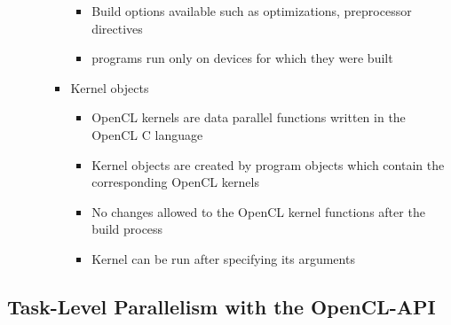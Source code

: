 \documentclass[paper=a4, fontsize=11pt]{scrartcl} %
\numberwithin{equation}{section} %
\numberwithin{figure}{section} %
\numberwithin{table}{section} %
\begin{document}
\begin{itemize}
\begin{itemize}
\begin{itemize}
\begin{itemize}
        \item Build options available such as optimizations, preprocessor directives
        \item programs run only on devices for which they were built
      \end{itemize}
      \item Kernel objects
      \begin{itemize}
        \item OpenCL kernels are data parallel functions written in the OpenCL C language
        \item Kernel objects are created by program objects which contain the corresponding OpenCL kernels
        \item No changes allowed to the OpenCL kernel functions after the build process
        \item Kernel can be run after specifying its arguments
      \end{itemize}
    \end{itemize}
  \end{itemize}
\end{itemize}

\subsection{Task-Level Parallelism with the OpenCL-API}
\end{document}
